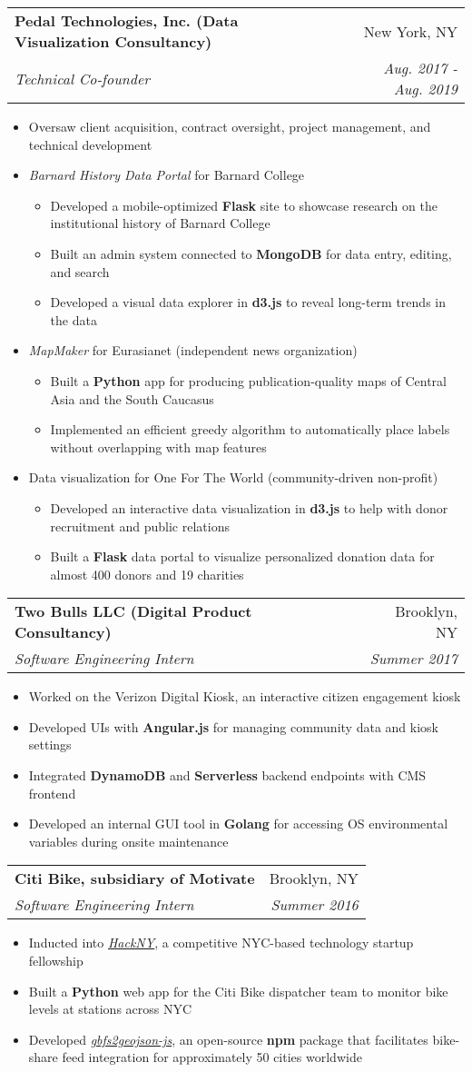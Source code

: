 \documentclass[letterpaper,11pt]{article}
\makeatletter
\newcommand{\resumeItemNoTitle}[1]{\item\small #1 \vspace{-2pt}}
\newcommand{\resumeSubheading}[4]{
  \vspace{-1pt}\item
    \begin{tabular*}{0.97\textwidth}[t]{l@{\extracolsep{\fill}}r}
      \textbf{#1} & #2 \\
      \textit{\small#3} & \textit{\small #4} \\
    \end{tabular*}\vspace{-5pt}
}
\newcommand{\resumeItemListStart}{\begin{itemize}}
\newcommand{\resumeListEnd}{\end{itemize}}
\makeatother
\begin{document}
    \resumeSubheading
      {Pedal Technologies, Inc. (Data Visualization Consultancy)}{New York, NY}
      {Technical Co-founder}{Aug. 2017 - Aug. 2019}
    \resumeItemListStart
      \resumeItemNoTitle {Oversaw client acquisition, contract oversight, project management, and technical development}
      \resumeItemNoTitle {\textit{Barnard History Data Portal} for Barnard College}
        \resumeItemListStart
          \resumeItemNoTitle {Developed a mobile-optimized \textbf{Flask} site to showcase research on the institutional history of Barnard College}
          \resumeItemNoTitle {Built an admin system connected to \textbf{MongoDB} for data entry, editing, and search}
          \resumeItemNoTitle {Developed a visual data explorer in \textbf{d3.js} to reveal long-term trends in the data}
        \end{itemize}
      \resumeItemNoTitle {\textit{MapMaker} for Eurasianet (independent news organization)}
        \resumeItemListStart
          \resumeItemNoTitle {Built a \textbf{Python} app for producing publication-quality maps of Central Asia and the South Caucasus}
          \resumeItemNoTitle {Implemented an efficient greedy algorithm to automatically place labels without overlapping with map features}
        \end{itemize}
      \resumeItemNoTitle {Data visualization for One For The World (community-driven non-profit)}
        \resumeItemListStart
          \resumeItemNoTitle {Developed an interactive data visualization in \textbf{d3.js} to help with donor recruitment and public relations}
          \resumeItemNoTitle {Built a \textbf{Flask} data portal to visualize personalized donation data for almost 400 donors and 19 charities}
        \resumeListEnd
    \resumeListEnd

    \resumeSubheading
      {Two Bulls LLC (Digital Product Consultancy)}{Brooklyn, NY}
      {Software Engineering Intern}{Summer 2017}
      \resumeItemListStart
        \resumeItemNoTitle {Worked on the Verizon Digital Kiosk, an interactive citizen engagement kiosk}
        \resumeItemNoTitle {Developed UIs with \textbf{Angular.js} for managing community data and kiosk settings}
        \resumeItemNoTitle {Integrated \textbf{DynamoDB} and \textbf{Serverless} backend endpoints with CMS frontend}
        \resumeItemNoTitle {Developed an internal GUI tool in \textbf{Golang} for accessing OS environmental variables during onsite maintenance}
      \resumeListEnd

    \resumeSubheading
      {Citi Bike, subsidiary of Motivate}{Brooklyn, NY}
      {Software Engineering Intern}{Summer 2016}
      \resumeItemListStart
        \resumeItemNoTitle {Inducted into \href{https://hackny.org/}{\textit{HackNY}}, a competitive NYC-based technology startup fellowship}
        \resumeItemNoTitle {Built a \textbf{Python} web app for the Citi Bike dispatcher team to monitor bike levels at stations across NYC}
        \resumeItemNoTitle {Developed \href{https://www.npmjs.com/package/gbfs2geojson-js}{\textit{gbfs2geojson-js}}, an open-source \textbf{npm} package that facilitates bike-share feed integration for approximately 50 cities worldwide}
      \resumeListEnd
\end{document}

